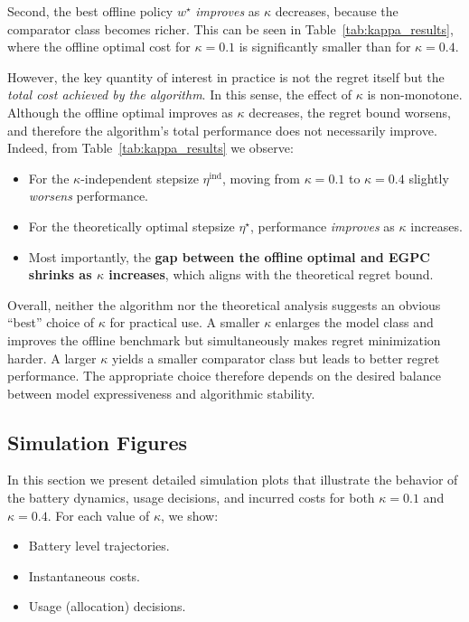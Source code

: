 Second, the best offline policy $w^\star$ \emph{improves} as $\kappa$ decreases,
because the comparator class becomes richer. This can be seen in
Table~\ref{tab:kappa_results}, where the offline optimal cost for $\kappa = 0.1$ is
significantly smaller than for $\kappa = 0.4$.

However, the key quantity of interest in practice is not the regret itself but the
\emph{total cost achieved by the algorithm}. In this sense, the effect of $\kappa$ is
non-monotone. Although the offline optimal improves as $\kappa$ decreases, the regret
bound worsens, and therefore the algorithm's total performance does not necessarily
improve. Indeed, from Table~\ref{tab:kappa_results} we observe:

\begin{itemize}
    \item For the $\kappa$-independent stepsize $\eta^{\mathrm{ind}}$, moving from
    $\kappa = 0.1$ to $\kappa = 0.4$ slightly \emph{worsens} performance.
    \item For the theoretically optimal stepsize $\eta^\star$, performance
    \emph{improves} as $\kappa$ increases.
    \item Most importantly, the \textbf{gap between the offline optimal and EGPC
    shrinks as $\kappa$ increases}, which aligns with the theoretical regret bound.
\end{itemize}

Overall, neither the algorithm nor the theoretical analysis suggests an obvious
“best” choice of $\kappa$ for practical use. A smaller $\kappa$ enlarges the model
class and improves the offline benchmark but simultaneously makes regret minimization
harder. A larger $\kappa$ yields a smaller comparator class but leads to better regret
performance. The appropriate choice therefore depends on the desired balance between
model expressiveness and algorithmic stability.






\subsection{Simulation Figures}

In this section we present detailed simulation plots that illustrate the behavior of
the battery dynamics, usage decisions, and incurred costs for both 
$\kappa = 0.1$ and $\kappa = 0.4$.  
For each value of $\kappa$, we show:

\begin{itemize}
    \item Battery level trajectories.
    \item Instantaneous costs.
    \item Usage (allocation) decisions.
\end{itemize}

